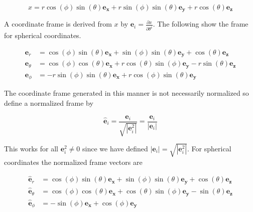\documentclass[10pt]{article}
\newcommand{\bfrac}[2]{\displaystyle\frac{#1}{#2}}
\newcommand{\abs}[1]{\left |{#1}\right |}
\newcommand{\pdiff}[2]{\bfrac{\partial {#1}}{\partial {#2}}}
\begin{document}
  \begin{equation}
  x =  r \cos\left({\phi}\right) \sin\left({\theta}\right){\bm{{e}_{x}}}+ r \sin\left({\phi}\right) \sin\left({\theta}\right){\bm{{e}_{y}}}+ r \cos\left({\theta}\right){\bm{{e}_{z}}}
  \end{equation}

A coordinate frame is derived from $x$ by
$\bm{e}_{i} = \pdiff{x}{\theta^{i}}$.  The following show the frame for
spherical coordinates.

  \begin{align}
  \bm{e}_{r} &= \cos\left({\phi}\right) \sin\left({\theta}\right){\bm{{e}_{x}}}+\sin\left({\phi}\right) \sin\left({\theta}\right){\bm{{e}_{y}}}+\cos\left({\theta}\right){\bm{{e}_{z}}} \\
  \bm{e}_{{\theta}} &= \cos\left({\phi}\right) \cos\left({\theta}\right){\bm{{e}_{x}}}+r \cos\left({\theta}\right) \sin\left({\phi}\right){\bm{{e}_{y}}} - r \sin\left({\theta}\right){\bm{{e}_{z}}}\\
  \bm{e}_{{\phi}} &=  - r \sin\left({\phi}\right) \sin\left({\theta}\right){\bm{{e}_{x}}}+r \cos\left({\phi}\right) \sin\left({\theta}\right){\bm{{e}_{y}}}
  \end{align}

The coordinate frame generated in this manner is not necessarily normalized so
define a normalized frame by

  \begin{equation}
  \bm{\hat{e}}_{i} = \bfrac{\bm{e}_{i}}{\sqrt{\abs{\bm{e}_{i}^{2}}}} = \bfrac{\bm{e}_{i}}{\abs{\bm{e}_{i}}}
  \end{equation}

This works for all $\bm{e}_{i}^{2} \neq 0$ since we have defined
$\abs{\bm{e}_{i}} = \sqrt{\abs{\bm{e}_{i}^{2}}}$.   For spherical
coordinates the normalized frame vectors are

  \begin{align}
  \bm{\hat{e}}_{r} &=  \cos\left({\phi}\right) \sin\left({\theta}\right){\bm{{e}_{x}}}+\sin\left({\phi}\right) \sin\left({\theta}\right){\bm{{e}_{y}}}+\cos\left({\theta}\right){\bm{{e}_{z}}} \\
  \bm{\hat{e}}_{{\theta}} &= \cos\left({\phi}\right) \cos\left({\theta}\right){\bm{{e}_{x}}}+\cos\left({\theta}\right) \sin\left({\phi}\right){\bm{{e}_{y}}}- \sin\left({\theta}\right){\bm{{e}_{z}}} \\
  \bm{\hat{e}}_{{\phi}} &= - \sin\left({\phi}\right){\bm{{e}_{x}}}+\cos\left({\phi}\right){\bm{{e}_{y}}}
  \end{align}
\end{document}
